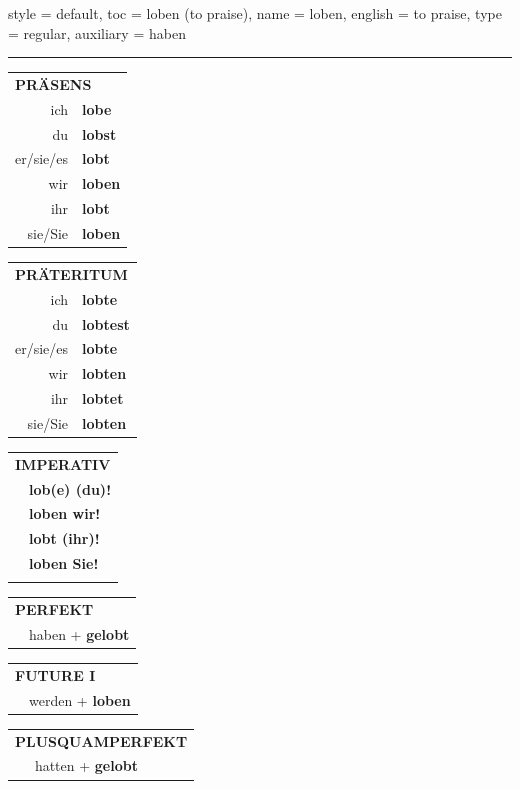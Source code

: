 \begin{verbentry}{
  style = {default},
  toc = {loben (to praise)},
  name = {loben},
  english = {to praise},
  type = {regular},
  auxiliary = {haben}
}
 
    
     \vspace{5pt}

    \hrule
    
    \vspace{5pt}

  \begin{tabular}{rl}
     \multicolumn{2}{l}{\textbf{PRÄSENS} }\\
    ich & \textbf{lobe}\\
    du & \textbf{lobst}\\
    er/sie/es & \textbf{lobt}\\
    wir & \textbf{loben}\\
    ihr & \textbf{lobt}\\
    sie/Sie & \textbf{loben}\\
  \end{tabular}
  \hfill
     \begin{tabular}{rl}
    \multicolumn{2}{l}{\textbf{PRÄTERITUM} }\\
    ich & \textbf{lobte}\\
    du & \textbf{lobtest}\\
    er/sie/es & \textbf{lobte}\\
    wir & \textbf{lobten}\\
    ihr & \textbf{lobtet}\\
    sie/Sie & \textbf{lobten}\\
  \end{tabular}
  \hfill
  \begin{tabular}{rl}
     \multicolumn{2}{l}{\textbf{IMPERATIV} }\\
   & \textbf{lob(e) (du)!}\\
   & \textbf{loben wir!}\\
   & \textbf{lobt (ihr)!}\\
   & \textbf{loben Sie!}\\
   & \vspace{10pt}
  \end{tabular}

    \vspace{10pt}

 \begin{tabular}{rl}
     \multicolumn{2}{l}{\textbf{PERFEKT}}\\
   & haben + \textbf{gelobt}\\
  \end{tabular}
\hfill
   \begin{tabular}{rl}
    \multicolumn{2}{l}{\textbf{FUTURE I} }\\
   & werden + \textbf{loben}\\
  \end{tabular}
\hfill
   \begin{tabular}{rl}
      \multicolumn{2}{l}{\textbf{PLUSQUAMPERFEKT}}\\
   & hatten + \textbf{gelobt}\\
  \end{tabular}


\end{verbentry}
